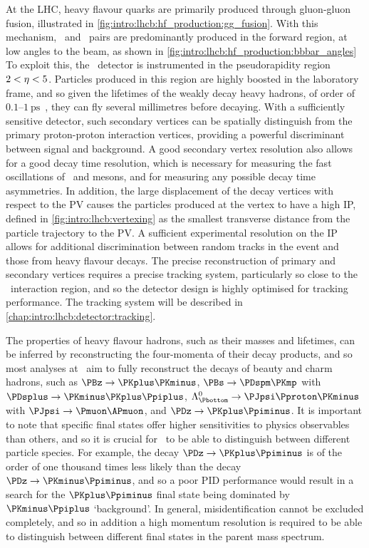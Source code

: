 At the \ac{LHC}, heavy flavour quarks are primarily produced through 
gluon-gluon fusion, illustrated in 
\cref{fig:intro:lhcb:hf_production:gg_fusion}.
With this mechanism, \bbbar\ and \ccbar\ pairs are predominantly produced in 
the forward region, at low angles to the beam, as shown in 
\cref{fig:intro:lhcb:hf_production:bbbar_angles}
To exploit this, the \lhcb\ detector is instrumented in the pseudorapidity 
region $2 < \eta < 5$.
Particles produced in this region are highly boosted in the laboratory frame, 
and so given the lifetimes of the weakly decay heavy hadrons, of order of 
$0.1$--$\SI{1}{\pico\second}$~\cite{PDG2014}, they can fly several millimetres 
before decaying.
With a sufficiently sensitive detector, such secondary vertices can be 
spatially distinguish from the primary proton-proton interaction vertices, 
providing a powerful discriminant between signal and background.
A good secondary vertex resolution also allows for a good decay time 
resolution, which is necessary for measuring the fast oscillations of \PBds\ 
and \PDzero mesons, and for measuring any possible decay time asymmetries.
In addition, the large displacement of the decay vertices with respect to the 
\ac{PV} causes the particles produced at the vertex to have a high \ac{IP}, 
defined in \cref{fig:intro:lhcb:vertexing} as the smallest transverse distance 
from the particle trajectory to the \ac{PV}.
A sufficient experimental resolution on the \ac{IP} allows for additional 
discrimination between random tracks in the event and those from heavy flavour 
decays.
The precise reconstruction of primary and secondary vertices requires a precise 
tracking system, particularly so close to the \pp\ interaction region, and so 
the detector design is highly optimised for tracking performance.
The tracking system will be described in 
\cref{chap:intro:lhcb:detector:tracking}.

The properties of heavy flavour hadrons, such as their masses and lifetimes, 
can be inferred by reconstructing the four-momenta of their decay products, and 
so most analyses at \lhcb\ aim to fully reconstruct the decays of beauty and 
charm hadrons, such as $\decay{\PBz}{\PKplus\PKminus}$, 
$\decay{\PBs}{\PDspm\PKmp}$ with $\decay{\PDsplus}{\PKminus\PKplus\Ppiplus}$, 
$\decay{\PLambdab}{\PJpsi\Pproton\PKminus}$ with 
$\decay{\PJpsi}{\Pmuon\APmuon}$, and $\decay{\PDz}{\PKplus\Ppiminus}$.
It is important to note that specific final states offer higher sensitivities 
to physics observables than others, and so it is crucial for \lhcb\ to be able 
to distinguish between different particle species.
For example, the decay $\decay{\PDz}{\PKplus\Ppiminus}$ is of the order of one 
thousand times less likely than the decay $\decay{\PDz}{\PKminus\Ppiminus}$, 
and so a poor \ac{PID} performance would result in a search for the 
$\PKplus\Ppiminus$ final state being dominated by $\PKminus\Ppiplus$ 
`background'.
In general, misidentification cannot be excluded completely, and so in addition 
a high momentum resolution is required to be able to distinguish between 
different final states in the parent mass spectrum.

